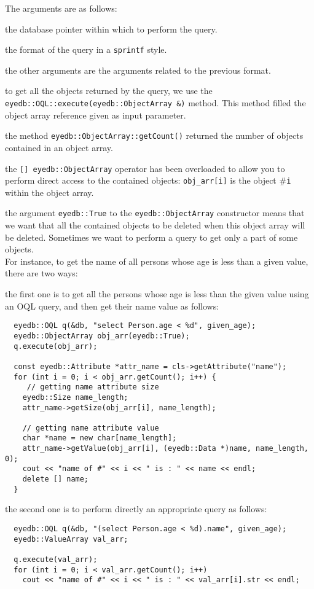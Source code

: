 The arguments are as follows:
\be
\item the database pointer within which to perform the query.
\item the format of the query in a \texttt{sprintf} style.
\item the other arguments are the arguments related to the previous
format.
\ee
\item to get all the objects returned by the query, we use the
\texttt{eyedb::OQL::execute(eyedb::ObjectArray \&)} method. This method filled
the object array reference given as input parameter.
\item the method \texttt{eyedb::ObjectArray::getCount()} returned the number
of objects contained in an object array.
\item the \texttt{[] eyedb::ObjectArray} operator has been overloaded to
allow you to perform direct access to the contained objects: \texttt{obj\_arr[i]} is
the object \#\texttt{i} within the object array.
\item the argument \texttt{eyedb::True} to the \texttt{eyedb::ObjectArray} constructor
means that we want that all the contained objects to be deleted
when this object array will be deleted.
\ee
Sometimes we want to perform a query to get only a part of some objects.
\\
For instance, to get the name of all persons whose age is less than
a given value, there are two ways:
\be
\item the first one is to get all the persons whose age is less
than the given value using an OQL query, and then get their name value
as follows:
\verbsize
\begin{verbatim}
  eyedb::OQL q(&db, "select Person.age < %
  eyedb::ObjectArray obj_arr(eyedb::True);
  q.execute(obj_arr);

  const eyedb::Attribute *attr_name = cls->getAttribute("name");
  for (int i = 0; i < obj_arr.getCount(); i++) {
     // getting name attribute size
    eyedb::Size name_length;
    attr_name->getSize(obj_arr[i], name_length);

    // getting name attribute value
    char *name = new char[name_length];
    attr_name->getValue(obj_arr[i], (eyedb::Data *)name, name_length, 0);
    cout << "name of #" << i << " is : " << name << endl;
    delete [] name;
  }  
\end{verbatim}
\normalsize
\item the second one is to perform directly an appropriate query as follows:
\verbsize
\begin{verbatim}
  eyedb::OQL q(&db, "(select Person.age < %
  eyedb::ValueArray val_arr;

  q.execute(val_arr);
  for (int i = 0; i < val_arr.getCount(); i++)
    cout << "name of #" << i << " is : " << val_arr[i].str << endl;
\end{verbatim}
